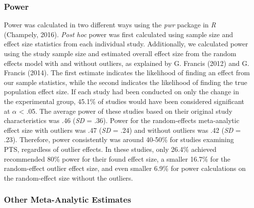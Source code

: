 \documentclass[english,man]{apa6}
\theoremstyle{definition}
\theoremstyle{definition}
\theoremstyle{definition}
\theoremstyle{remark}
\begin{document}
\subsubsection{Power}\label{power}

Power was calculated in two different ways using the \emph{pwr} package
in \emph{R} (Champely, 2016). \emph{Post hoc} power was first calculated
using sample size and effect size statistics from each individual study.
Additionally, we calculated power using the study sample size and
estimated overall effect size from the random effects model with and
without outliers, as explained by G. Francis (2012) and G. Francis
(2014). The first estimate indicates the likelihood of finding an effect
from our sample statistics, while the second indicates the likelihood of
finding the true population effect size. If each study had been
conducted on only the change in the experimental group, 45.1\% of
studies would have been considered significant at \(\alpha\) \textless{}
.05. The average power of these studies based on their original study
characteristics was .46 (\emph{SD} = .36). Power for the random-effects
meta-analytic effect size with outliers was .47 (\emph{SD} = .24) and
without outliers was .42 (\emph{SD} = .23). Therefore, power
consistently was around 40-50\% for studies examining PTS, regardless of
outlier effects. In these studies, only 26.4\% achieved recommended 80\%
power for their found effect size, a smaller 16.7\% for the
random-effect outlier effect size, and even smaller 6.9\% for power
calculations on the random-effect size without the outliers.

\subsubsection{Other Meta-Analytic
Estimates}\label{other-meta-analytic-estimates}
\end{document}
